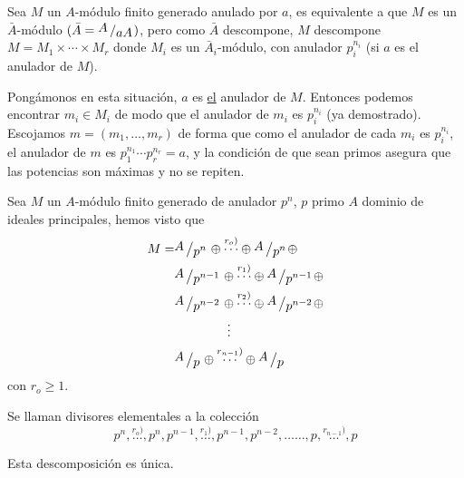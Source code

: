 \begin{prop}
    Sea $M$ un $A$-m\'odulo finito generado anulado por $a$, es equivalente a que $M$ es un $\bar A$-m\'odulo $(\bar A = \modulo{A}{aA})$, pero como $\bar A$ descompone, $M$ descompone $M = M_1\times \cdots \times M_r$ donde $M_i$ es un $\bar A_i$-m\'odulo, con anulador $p_i^{n_i}$ (si $a$ es el anulador de $M$).

    Pong\'amonos en esta situaci\'on, $a$ es \underline{el} anulador de $M$. Entonces podemos encontrar $m_i \in M_i$ de modo que el anulador de $m_i$ es $p_i^{n_i}$ (ya demostrado). Escojamos $m=(m_1, \ldots, m_r)$ de forma que como el anulador de cada $m_i$ es $p_i^{n_i}$, el anulador de $m$ es $p_1^{n_1} \cdots p_r^{n_r} = a$, y la condici\'on de que sean primos asegura que las potencias son m\'aximas y no se repiten. 
\end{prop}
\begin{teo}
    Sea $M$ un $A$-m\'odulo finito generado de anulador $p^n$, $p$ primo $A$ dominio de ideales principales, hemos visto que 
    \begin{align*}
        M = & \modulo{A}{p^n} \oplus\overset{r_o)}{\cdots}\oplus \modulo{A}{p^n} \oplus\\  
        & \modulo{A}{p^{n-1}} \oplus \overset{r_1)}{\cdots} \oplus\modulo{A}{p^{n-1}} \oplus\\ 
        & \modulo{A}{p^{n-2}} \oplus \overset{r_2)}{\cdots} \oplus\modulo{A}{p^{n-2}} \oplus\\ 
        & \qquad \qquad \vdots \\ 
        & \modulo{A}{p} \oplus \overset{r_{n-1})}{\cdots} \oplus\modulo{A}{p} 
    \end{align*}
    con $r_o \geq 1$. 
\end{teo}
\begin{defi}
    Se llaman divisores elementales a la colecci\'on
    $$p^n, \overset{r_o)}{\ldots} , p^n, p^{n-1}, \overset{r_1)}{\ldots}, p^{n-1}, p^{n-2}, \ldots \ldots, p, \overset{r_{n-1})}{\ldots} , p $$
\end{defi}
\begin{prop}
    Esta descomposici\'on es \'unica.
\end{prop}
